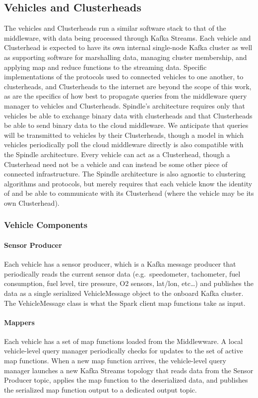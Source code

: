 \documentclass{thesis}
\begin{document}
\subsection{Vehicles and Clusterheads}
    The vehicles and Clusterheads run a similar software stack to that of the middleware, with data being
    processed through Kafka Streams. Each vehicle and Clusterhead is expected to have its own internal
    single-node Kafka cluster as well as supporting software for marshalling data, managing cluster membership,
    and applying map and reduce functions to the streaming data.
    Specific implementations of the protocols used to connected vehicles to one another, to clusterheads, and Clusterheads
    to the internet are beyond the scope of this work, as are the specifics of how best to propagate queries from the middleware
    query manager to vehicles and Clusterheads. Spindle's architecture requires only that vehicles be able to exchange binary
    data with clusterheads and that Clusterheads be able to send binary data to the cloud middleware. We anticipate that queries
    will be transmitted to vehicles by their Clusterheads, though a model in which vehicles periodically poll the cloud middleware
    directly is also compatible with the Spindle architecture.
    Every vehicle can act as a Clusterhead, though a Clusterhead need not be a vehicle and can instead be some other piece of
    connected infrastructure. The Spindle architecture is also agnostic to clustering algorithms and protocols, but merely requires
    that each vehicle know the identity of and be able to communicate with its Clusterhead (where the vehicle may be its own Clusterhead).
\subsubsection{Vehicle Components}
    \paragraph{Sensor Producer} 
        Each vehicle has a sensor producer, which is a Kafka message producer that periodically reads the current sensor data (e.g.\
        speedometer, tachometer, fuel consumption, fuel level, tire pressure, O2 sensors, lat/lon, etc\dots) and publishes the data
        as a single serialized VehicleMessage object to the onboard Kafka cluster. The VehicleMessage class is what the Spark client
        map functions take as input.
    \paragraph{Mappers}
        Each vehicle has a set of map functions loaded from the Middlewware. A local vehicle-level query manager periodically checks
        for updates to the set of active map functions. When a new map function arrives, the vehicle-level query manager
        launches a new Kafka Streams topology that reads data from the Sensor Producer topic, applies the map function to the 
        deserialized data, and publishes the serialized map function output to a dedicated output topic.
\end{document}
